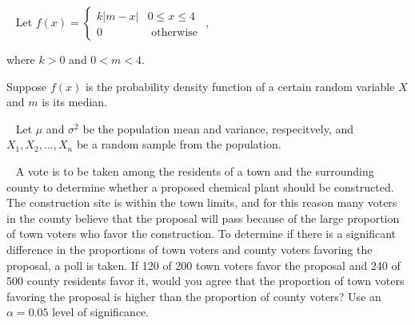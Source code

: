 \documentclass[letterpaper,10pt,addpoints]{exam}
\begin{document}


\newpage
\begin{questions}
\question[15]~
Let $f(x)=\left\{\begin{array}{cl}k|m-x| & 0 \leq x \leq 4 \\ 0 & \text { otherwise }\end{array}\right.$, 

where $k>0$ and $0<m<4$.

Suppose $f(x)$ is the probability density function of a certain random variable $X$ and $m$ is its median. 



\question[15]~
Let $\mu$ and $\sigma^2$ be the population mean and variance, respecitvely, and $X_1,X_2,...,X_n$ be a random sample from the population. 

\question[10] ~
A vote is to be taken among the residents of a town and the surrounding county to determine whether a proposed chemical plant should be constructed. The construction site is within the town limits, and for this reason many voters in the county believe that the proposal will pass because of the large proportion of town voters who favor the construction. To determine if there is a significant difference in the proportions of town voters and county voters favoring the proposal, a poll is taken. If 120 of 200 town voters favor the proposal and 240 of 500 county residents favor it, would you agree that the proportion of town voters favoring the proposal is higher than the proportion of county voters? Use an $\alpha=0.05$ level of significance.


\end{questions}
\end{document}
